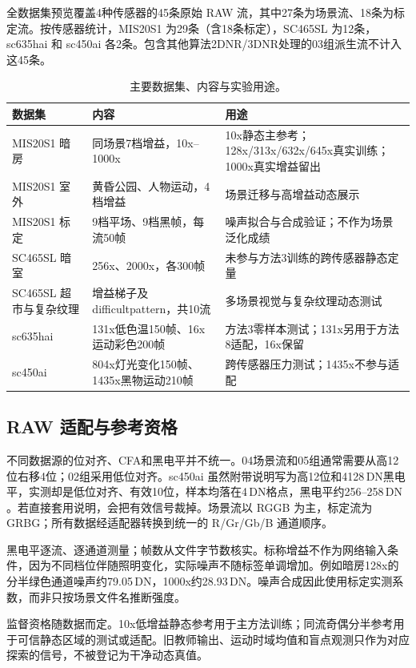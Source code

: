 \documentclass[11pt,a4paper,UTF8,fontset=fandol]{ctexart}
\newcommand{\dn}{\ensuremath{\,\mathrm{DN}}}
\begin{document}
全数据集预览覆盖4种传感器的45条原始 RAW 流，其中27条为场景流、18条为标定流。按传感器统计，MIS20S1 为29条（含18条标定），SC465SL 为12条，sc635hai 和 sc450ai 各2条。包含其他算法2DNR/3DNR处理的03组派生流不计入这45条。

\begin{table}[H]
\centering\small
\caption{主要数据集、内容与实验用途。}
\label{tab:dataset}
\begin{tabular}{P{0.20\textwidth}P{0.29\textwidth}P{0.40\textwidth}}
\toprule
数据集 & 内容 & 用途 \\
\midrule
MIS20S1 暗房 & 同场景7档增益，10x--1000x & 10x静态主参考；128x/313x/632x/645x真实训练；1000x真实增益留出 \\
MIS20S1 室外 & 黄昏公园、人物运动，4档增益 & 场景迁移与高增益动态展示 \\
MIS20S1 标定 & 9档平场、9档黑帧，每流50帧 & 噪声拟合与合成验证；不作为场景泛化成绩 \\
SC465SL 暗室 & 256x、2000x，各300帧 & 未参与方法3训练的跨传感器静态定量 \\
SC465SL 超市与复杂纹理 & 增益梯子及 difficultpattern，共10流 & 多场景视觉与复杂纹理动态测试 \\
sc635hai & 131x低色温150帧、16x运动彩色200帧 & 方法3零样本测试；131x另用于方法8适配，16x保留 \\
sc450ai & 804x灯光变化150帧、1435x黑物运动210帧 & 跨传感器压力测试；1435x不参与适配 \\
\bottomrule
\end{tabular}
\end{table}

\subsection{RAW 适配与参考资格}

不同数据源的位对齐、CFA和黑电平并不统一。04场景流和05组通常需要从高12位右移4位；02组采用低位对齐。sc450ai 虽然附带说明写为高12位和4128\dn 黑电平，实测却是低位对齐、有效10位，样本均落在4\dn 格点，黑电平约256--258\dn。若直接套用说明，会把有效信号裁掉。场景流以 RGGB 为主，标定流为 GRBG；所有数据经适配器转换到统一的 R/Gr/Gb/B 通道顺序。

黑电平逐流、逐通道测量；帧数从文件字节数核实。标称增益不作为网络输入条件，因为不同档位伴随照明变化，实际噪声不随标签单调增加。例如暗房128x的分半绿色通道噪声约79.05\dn，1000x约28.93\dn。噪声合成因此使用标定实测系数，而非只按场景文件名推断强度。

监督资格随数据而定。10x低增益静态参考用于主方法训练；同流奇偶分半参考用于可信静态区域的测试或适配。旧教师输出、运动时域均值和盲点观测只作为对应探索的信号，不被登记为干净动态真值。
\end{document}
